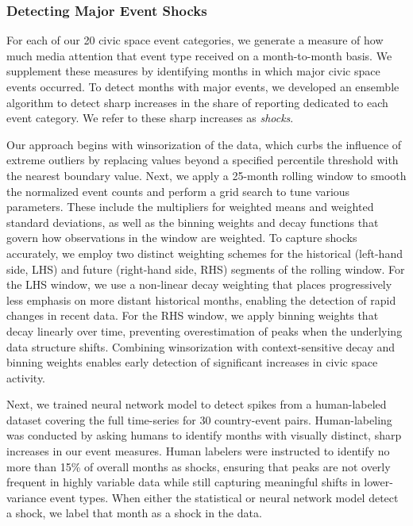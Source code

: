 \documentclass[
  letterpaper,
  DIV=11,
  numbers=noendperiod]{scrartcl}
\begin{document}
\hypertarget{detecting-major-event-shocks}{%
\subsubsection{Detecting Major Event
Shocks}\label{detecting-major-event-shocks}}

For each of our 20 civic space event categories, we generate a measure
of how much media attention that event type received on a month-to-month
basis. We supplement these measures by identifying months in which major
civic space events occurred. To detect months with major events, we
developed an ensemble algorithm to detect sharp increases in the share
of reporting dedicated to each event category. We refer to these sharp
increases as \emph{shocks}.

Our approach begins with winsorization of the data, which curbs the
influence of extreme outliers by replacing values beyond a specified
percentile threshold with the nearest boundary value. Next, we apply a
25-month rolling window to smooth the normalized event counts and
perform a grid search to tune various parameters. These include the
multipliers for weighted means and weighted standard deviations, as well
as the binning weights and decay functions that govern how observations
in the window are weighted. To capture shocks accurately, we employ two
distinct weighting schemes for the historical (left-hand side, LHS) and
future (right-hand side, RHS) segments of the rolling window. For the
LHS window, we use a non-linear decay weighting that places
progressively less emphasis on more distant historical months, enabling
the detection of rapid changes in recent data. For the RHS window, we
apply binning weights that decay linearly over time, preventing
overestimation of peaks when the underlying data structure shifts.
Combining winsorization with context-sensitive decay and binning weights
enables early detection of significant increases in civic space
activity.

Next, we trained neural network model to detect spikes from a
human-labeled dataset covering the full time-series for 30 country-event
pairs. Human-labeling was conducted by asking humans to identify months
with visually distinct, sharp increases in our event measures. Human
labelers were instructed to identify no more than 15\% of overall months
as shocks, ensuring that peaks are not overly frequent in highly
variable data while still capturing meaningful shifts in lower-variance
event types. When either the statistical or neural network model detect
a shock, we label that month as a shock in the data.
\end{document}
